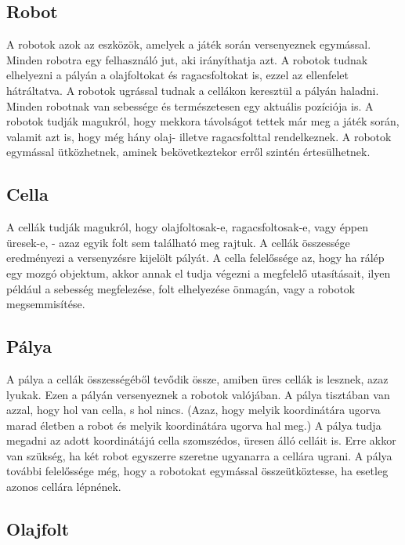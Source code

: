 
\subsection{Robot}

A robotok azok az eszközök, amelyek a játék során versenyeznek egymással. Minden robotra egy felhasználó jut, aki irányíthatja azt. A robotok tudnak elhelyezni a pályán a olajfoltokat és ragacsfoltokat is, ezzel az ellenfelet hátráltatva. A robotok ugrással tudnak a cellákon keresztül a pályán haladni. Minden robotnak van sebessége és természetesen egy aktuális pozíciója is. A robotok tudják magukról, hogy mekkora távolságot tettek már meg a játék során, valamit azt is, hogy még hány olaj- illetve ragacsfolttal rendelkeznek. A robotok egymással ütközhetnek, aminek bekövetkeztekor erről szintén értesülhetnek.

\subsection{Cella}

A cellák tudják magukról, hogy olajfoltosak-e, ragacsfoltosak-e, vagy éppen üresek-e, - azaz egyik folt sem található meg rajtuk. A cellák összessége eredményezi a versenyzésre kijelölt pályát. A cella felelőssége az, hogy ha rálép egy mozgó objektum, akkor annak el tudja végezni a megfelelő utasításait, ilyen például a sebesség megfelezése, folt elhelyezése önmagán, vagy a robotok megsemmisítése.

\subsection{Pálya}

A pálya a cellák összességéből tevődik össze, amiben üres cellák is lesznek, azaz lyukak. Ezen a pályán versenyeznek a robotok valójában. A pálya tisztában van azzal, hogy hol van cella, s hol nincs. (Azaz, hogy melyik koordinátára ugorva marad életben a robot és melyik koordinátára ugorva hal meg.) A pálya tudja megadni az adott koordinátájú cella szomszédos, üresen álló celláit is. Erre akkor van szükség, ha két robot egyszerre szeretne ugyanarra a cellára ugrani. A pálya további felelőssége még, hogy a robotokat egymással összeütköztesse, ha esetleg azonos cellára lépnének. 

\subsection{Olajfolt}

